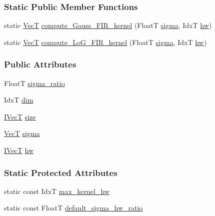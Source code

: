 \subsubsection*{Static Public Member Functions}
\begin{DoxyCompactItemize}
\item 
static \hyperlink{classboxxer_1_1DoGFilter2D_a77bd6efdb8dc5643aa30c2575c9da261}{VecT} \hyperlink{classboxxer_1_1GaussFIRFilter_a5dd6de5fe82092ec30141ab920d75dfd}{compute\+\_\+\+Gauss\+\_\+\+F\+I\+R\+\_\+kernel} (FloatT \hyperlink{classboxxer_1_1GaussFIRFilter_a66ced06c688fd544d5f1f8be39aa2125}{sigma}, IdxT \hyperlink{classboxxer_1_1GaussFIRFilter_ae17a4e137303e452a9223ba34825e0da}{hw})
\item 
static \hyperlink{classboxxer_1_1DoGFilter2D_a77bd6efdb8dc5643aa30c2575c9da261}{VecT} \hyperlink{classboxxer_1_1GaussFIRFilter_ad6a618b47db57b570278cc57b05d8c03}{compute\+\_\+\+Lo\+G\+\_\+\+F\+I\+R\+\_\+kernel} (FloatT \hyperlink{classboxxer_1_1GaussFIRFilter_a66ced06c688fd544d5f1f8be39aa2125}{sigma}, IdxT \hyperlink{classboxxer_1_1GaussFIRFilter_ae17a4e137303e452a9223ba34825e0da}{hw})
\end{DoxyCompactItemize}
\subsubsection*{Public Attributes}
\begin{DoxyCompactItemize}
\item 
FloatT \hyperlink{classboxxer_1_1DoGFilter2D_a68e3d95c06f7d41782be2d1a1db96ace}{sigma\+\_\+ratio}
\item 
IdxT \hyperlink{classboxxer_1_1GaussFIRFilter_ac7adcd4d8f8efee00a65262f596c8eda}{dim}
\item 
\hyperlink{classboxxer_1_1GaussFIRFilter_a0083c8c9ab6032dd458b4dc93852c2b8}{I\+VecT} \hyperlink{classboxxer_1_1GaussFIRFilter_ac0d4e19bb2be3e8913e77283e7e4317e}{size}
\item 
\hyperlink{classboxxer_1_1DoGFilter2D_a77bd6efdb8dc5643aa30c2575c9da261}{VecT} \hyperlink{classboxxer_1_1GaussFIRFilter_a66ced06c688fd544d5f1f8be39aa2125}{sigma}
\item 
\hyperlink{classboxxer_1_1GaussFIRFilter_a0083c8c9ab6032dd458b4dc93852c2b8}{I\+VecT} \hyperlink{classboxxer_1_1GaussFIRFilter_ae17a4e137303e452a9223ba34825e0da}{hw}
\end{DoxyCompactItemize}
\subsubsection*{Static Protected Attributes}
\begin{DoxyCompactItemize}
\item 
static const IdxT \hyperlink{classboxxer_1_1GaussFIRFilter_a7f85e018f78753ee4fedf65c04b0c65a}{max\+\_\+kernel\+\_\+hw}
\item 
static const FloatT \hyperlink{classboxxer_1_1GaussFIRFilter_a72b51cd7549510735179cb9c94f5f43f}{default\+\_\+sigma\+\_\+hw\+\_\+ratio}
\end{DoxyCompactItemize}
